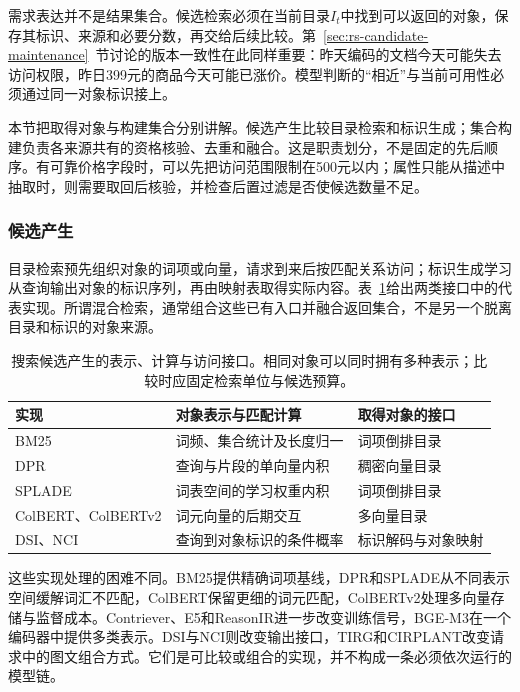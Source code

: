 需求表达并不是结果集合。候选检索必须在当前目录$I_t$中找到可以返回的对象，保存其标识、来源和必要分数，再交给后续比较。第~\ref{sec:rs-candidate-maintenance}~节讨论的版本一致性在此同样重要：昨天编码的文档今天可能失去访问权限，昨日399元的商品今天可能已涨价。模型判断的“相近”与当前可用性必须通过同一对象标识接上。

本节把取得对象与构建集合分别讲解。候选产生比较目录检索和标识生成；集合构建负责各来源共有的资格核验、去重和融合。这是职责划分，不是固定的先后顺序。有可靠价格字段时，可以先把访问范围限制在500元以内；属性只能从描述中抽取时，则需要取回后核验，并检查后置过滤是否使候选数量不足。

\subsubsection{候选产生}
\label{sec:rs-search-generation}

目录检索预先组织对象的词项或向量，请求到来后按匹配关系访问；标识生成学习从查询输出对象的标识序列，再由映射表取得实际内容。表~\ref{tab:rs-search-retrieval-interfaces}给出两类接口中的代表实现。所谓混合检索，通常组合这些已有入口并融合返回集合，不是另一个脱离目录和标识的对象来源。

\begin{table}[htbp]
 \centering
 \begin{tabularx}{\linewidth}{lXl}
  \toprule
  实现 & 对象表示与匹配计算 & 取得对象的接口 \\
  \midrule
  BM25 & 词频、集合统计及长度归一 & 词项倒排目录 \\
  DPR & 查询与片段的单向量内积 & 稠密向量目录 \\
  SPLADE & 词表空间的学习权重内积 & 词项倒排目录 \\
  ColBERT、ColBERTv2 & 词元向量的后期交互 & 多向量目录 \\
  DSI、NCI & 查询到对象标识的条件概率 & 标识解码与对象映射 \\
  \bottomrule
 \end{tabularx}
 \caption{搜索候选产生的表示、计算与访问接口。相同对象可以同时拥有多种表示；比较时应固定检索单位与候选预算。}
 \label{tab:rs-search-retrieval-interfaces}
\end{table}

这些实现处理的困难不同。BM25提供精确词项基线，DPR和SPLADE从不同表示空间缓解词汇不匹配，ColBERT保留更细的词元匹配，ColBERTv2处理多向量存储与监督成本。Contriever、E5和ReasonIR进一步改变训练信号，BGE-M3在一个编码器中提供多类表示。DSI与NCI则改变输出接口，TIRG和CIRPLANT改变请求中的图文组合方式。它们是可比较或组合的实现，并不构成一条必须依次运行的模型链。

